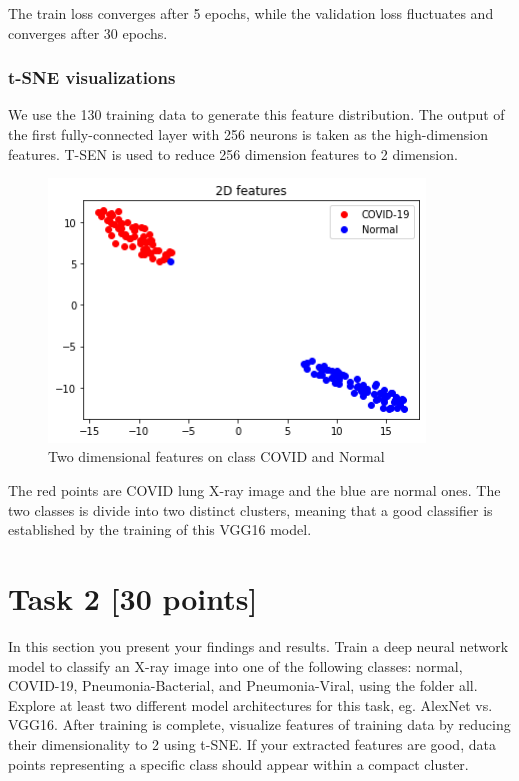 \documentclass[a4paper,12pt]{article}
\begin{document}
The train loss converges after 5 epochs, 
while the validation loss fluctuates and converges after 30 epochs.

\subsubsection{t-SNE visualizations}

We use the 130 training data to generate this feature distribution. 
The output of the first fully-connected layer with 256 neurons is taken as 
the high-dimension features. T-SEN is used to reduce 256 dimension features to 2 dimension.

\begin{figure}[H]
  \centering
  \includegraphics[width=10cm]{./images/task1-tsen.png}
     \caption{Two dimensional features on class COVID and Normal}
        \label{task1-tsen}
\end{figure}

The red points are COVID lung X-ray image and the blue are normal ones. 
The two classes is divide into two distinct clusters, 
meaning that a good classifier is established by the training of this VGG16 model.


\section{Task 2 [30 points]}
In this section you present your findings and results.
Train a deep neural network model to classify an X-ray image into one of the following classes: 
normal, COVID-19, Pneumonia-Bacterial, and Pneumonia-Viral, 
using the folder all. 
Explore at least two different model architectures for this task, eg. AlexNet vs. VGG16. 
After training is complete, visualize features of training data by reducing their dimensionality to 2 using t-SNE. 
If your extracted features are good, data points representing a specific class should appear within a compact cluster. 
\end{document}
